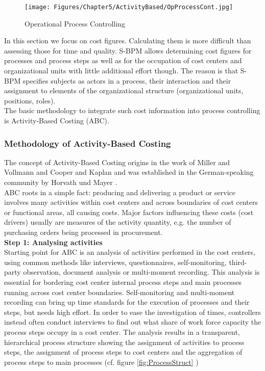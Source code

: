 \begin{figure}[htbp]
	\centering
	\texttt{[image: Figures/Chapter5/ActivityBased/OpProcessCont.jpg]}
	\caption[Operational Process Controlling]{Operational Process Controlling}
	\label{fig:OpProcessCont}
\end{figure}

In this section we focus on cost figures. Calculating them is more difficult than assessing those for time and quality. S-BPM allows determining cost figures for processes and process steps as well as for the occupation of cost centers and organizational units with little additional effort though. The reason is that S-BPM specifies subjects as actors in a process, their interaction and their assignment to elements of the organizational structure (organizational units, positions, roles).
\\
The basic methodology to integrate such cost information into process controlling is Activity-Based Costing (ABC).


\subsubsection{Methodology of Activity-Based Costing}
The concept of Activity-Based Costing origins in the work of Miller and Vollmann \cite{article:HiddenFactory} and Cooper and Kaplan \cite{article:MeasureCost} and was established in the German-speaking community by Horvath und Mayer \cite{article:Prozesskosten}.
\\
ABC roots in a simple fact: producing and delivering a product or service involves many activities within cost centers and across boundaries of cost centers or functional areas, all causing costs. Major factors influencing these costs (cost drivers) usually are measures of the activity quantity, e.g. the number of purchasing orders being processed in procurement.
\\
\newline
\textbf{Step 1: Analysing activities}
\\
Starting point for ABC is an analysis of activities performed in the cost centers, using common methods like interviews, questionnaires, self-monitoring, third-party observation, document analysis or multi-moment recording. This analysis is essential for bordering cost center internal process steps and main processes running across cost center boundaries. Self-monitoring and multi-moment recording can bring up time standards for the execution of processes and their steps, but needs high effort. In order to ease the investigation of times, controllers instead often conduct interviews to find out what share of work force capacity the process steps occupy in a cost center.
The analysis results in a transparent, hierarchical process structure showing the assignment of activities to process steps, the assignment of process steps to cost centers and the aggregation of process steps to main processes (cf. figure \ref{fig:ProcessStruct} )

